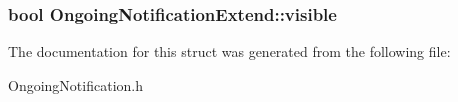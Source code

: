 \subsubsection[{visible}]{\setlength{\rightskip}{0pt plus 5cm}bool Ongoing\-Notification\-Extend\-::visible}\label{structOngoingNotificationExtend_ab4c1c650129c5ccddc1c152076e9626a}


The documentation for this struct was generated from the following file\-:\begin{DoxyCompactItemize}
\item 
Ongoing\-Notification.\-h\end{DoxyCompactItemize}
